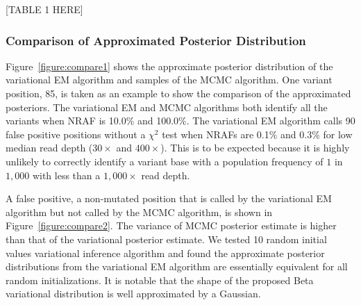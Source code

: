 \documentclass{bmcart}
\begin{document}
\vspace{2em}
\begin{center}
[TABLE 1 HERE]  
\end{center}
\vspace{2em}


\subsubsection{Comparison of Approximated Posterior Distribution}

Figure~\ref{figure:compare1} shows the approximate posterior distribution of the variational EM algorithm and samples of the MCMC algorithm.
One variant position, 85, is taken as an example to show the comparison of the approximated posteriors.
The variational EM and MCMC algorithms both identify all the variants when NRAF is 10.0\% and 100.0\%.
The variational EM algorithm calls 90 false positive positions without a $\chi^2$ test when NRAFs are 0.1\% and 0.3\% for low median read depth ($30\times$ and $400\times$).
This is to be expected because it is highly unlikely to correctly identify a variant base with a population frequency of $1$ in $1,000$ with less than a $1,000\times$ read depth.

A false positive, a non-mutated position that is called by the variational EM algorithm but not called by the MCMC algorithm, is shown in Figure~\ref{figure:compare2}.
The variance of MCMC posterior estimate is higher than that of the variational posterior estimate.
We tested 10 random initial values variational inference algorithm and found the approximate posterior distributions from the variational EM algorithm are essentially equivalent for all random initializations.
It is notable that the shape of the proposed Beta variational distribution is well approximated by a Gaussian.

\end{document}
